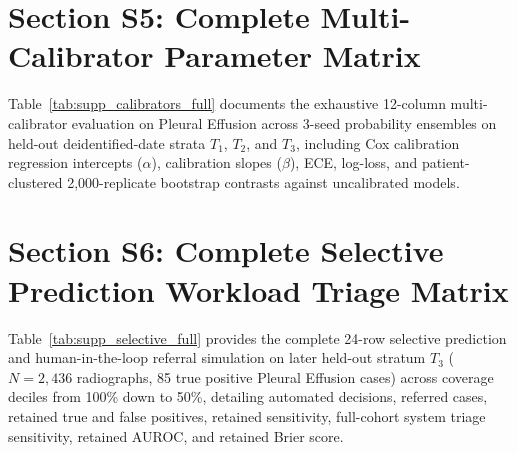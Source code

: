 \documentclass[preprint,12pt]{elsarticle}
\begin{document}
\section*{Section S5: Complete Multi-Calibrator Parameter Matrix}
Table~\ref{tab:supp_calibrators_full} documents the exhaustive 12-column multi-calibrator evaluation on Pleural Effusion across 3-seed probability ensembles on held-out deidentified-date strata $T_1$, $T_2$, and $T_3$, including Cox calibration regression intercepts ($\alpha$), calibration slopes ($\beta$), ECE, log-loss, and patient-clustered 2,000-replicate bootstrap contrasts against uncalibrated models.

\begin{table}[!htbp]
\caption{Supplementary Table S4: Complete 12-Column Multi-Calibrator Comparison on Pleural Effusion across 3-Seed Probability Ensembles, Evaluating Cox Intercept ($\alpha$), Slope ($\beta$), ECE, Log-Loss, and Paired Bootstrap Contrasts.}
\label{tab:supp_calibrators_full}
\centering
\resizebox{\textwidth}{!}{%

}
\end{table}

\section*{Section S6: Complete Selective Prediction Workload Triage Matrix}
Table~\ref{tab:supp_selective_full} provides the complete 24-row selective prediction and human-in-the-loop referral simulation on later held-out stratum $T_3$ ($N = 2,436$ radiographs, 85 true positive Pleural Effusion cases) across coverage deciles from 100\% down to 50\%, detailing automated decisions, referred cases, retained true and false positives, retained sensitivity, full-cohort system triage sensitivity, retained AUROC, and retained Brier score.

\begin{table}[!htbp]
\caption{Supplementary Table S5: Complete 24-Row Selective Prediction and Reader Referral Triage Simulation on Later Held-Out Stratum $T_3$ ($N = 2,436$ Radiographs, 85 Positive Pleural Effusion Cases) across All Coverage Regimes (100\% to 50\%).}
\label{tab:supp_selective_full}
\centering
\resizebox{\textwidth}{!}{%

}
\end{table}
\end{document}

